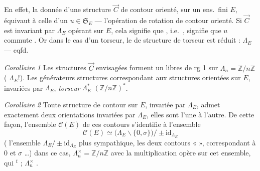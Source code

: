 \documentclass[11pt,a4paper]{article}
\begin{document}
En effet, la donnée d'une structure $\vec{C}$   de
contour orienté, sur un ens.\ fini $E$, équivaut à celle d'un
$u \in \mathfrak{S}_E$ — l'opération de rotation  de
contour orienté. Si  \ill{} $\vec{C}$ est invariant par
$\Lambda_E$ opérant sur $E$, cela signifie que 
, i.e.\ \ill{}, signifie que $u$ commute \ill{}. Or dans le
cas d'un torseur, le  de \ill{} structure de torseur est
réduit : $\Lambda_E$ — cqfd.

\emph{Corollaire 1}  Les structures $\vec{C}$ envisagées forment un
  \ill{} libres de rg 1 sur
$\Lambda_n = \mathbb{Z}/n\mathbb{Z}$ ( $\Lambda_E$!). Les
générateurs \ill{} \ill{} structures correspondant aux structures
 orientées sur $E$, invariées par $\Lambda_E$,
 \emph{torseur} 
$\Lambda_E^{*}$  $(\mathbb{Z}/n\mathbb{Z})^{*}$.

\emph{Corollaire 2} Toute structure  de contour  sur
$E$, invariée par $\Lambda_E$, admet exactement deux orientations invariées par
$\Lambda_E$, elles sont  l'une à l'autre. De cette façon,
l'ensemble $\mathcal{C}(E)$ de ces contours s'identifie à l'ensemble
\[
\mathcal{C}(E) \simeq \bigl( \Lambda_E \smallsetminus \{0, \sigma\} \bigr) / \pm \mathrm{id}_{\Lambda_E}
\]
(\struck{\ill{}}  l'ensemble $\Lambda_E / \pm \mathrm{id}_{\Lambda_E}$
plus sympathique,   les deux contours
 «  », correspondant à $0$ et
$\sigma$ …) dans ce cas,  
$\Lambda_n^{\times} = \mathbb{Z}/n\mathbb{Z}$ avec la multiplication
\struck{\ill{}}  opère sur cet ensemble, qui 
 \add{\ill{}} \struck{\ill{}} $^{t}$ ;
$\Lambda_n^{\times}$  
\struck{\ill{}}.
\end{document}
